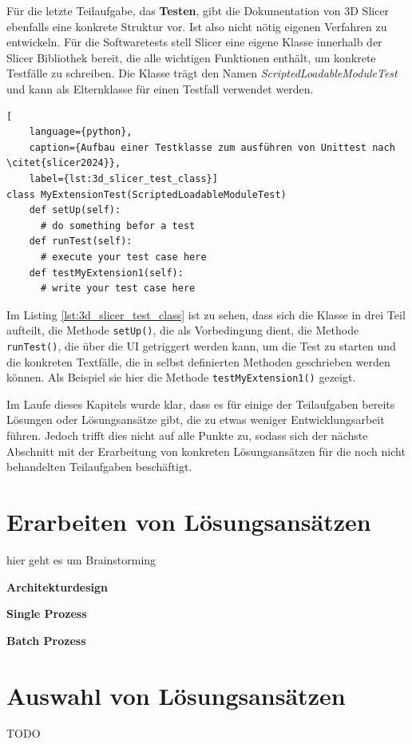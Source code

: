 Für die letzte Teilaufgabe, das \textbf{Testen}, gibt die Dokumentation von 3D Slicer
ebenfalls eine konkrete Struktur vor. Ist also nicht nötig eigenen Verfahren zu
entwickeln. Für die Softwaretests stell Slicer eine eigene Klasse innerhalb der Slicer
Bibliothek bereit, die alle wichtigen Funktionen enthält, um konkrete Testfälle zu
schreiben. Die Klasse trägt den Namen \textsl{ScriptedLoadableModuleTest} und kann
als Elternklasse für einen Testfall verwendet werden.

\begin{lstlisting}[
    language={python},
    caption={Aufbau einer Testklasse zum ausführen von Unittest nach \citet{slicer2024}},
    label={lst:3d_slicer_test_class}]
class MyExtensionTest(ScriptedLoadableModuleTest)
    def setUp(self):
      # do something befor a test
    def runTest(self):
      # execute your test case here
    def testMyExtension1(self):
      # write your test case here
\end{lstlisting}

Im Listing \ref{lst:3d_slicer_test_class} ist zu sehen, dass sich die Klasse in drei
Teil aufteilt, die Methode \texttt{setUp()}, die als Vorbedingung dient, die Methode
\texttt{runTest()}, die über die UI getriggert werden kann, um die Test zu
starten und die konkreten Textfälle, die in selbst definierten Methoden geschrieben
werden können. Als Beispiel sie hier die Methode \texttt{testMyExtension1()} gezeigt.

Im Laufe dieses Kapitels wurde klar, dass es für einige der Teilaufgaben bereits
Lösungen oder Lösungsansätze gibt, die zu etwas weniger Entwicklungsarbeit führen.
Jedoch trifft dies nicht auf alle Punkte zu, sodass sich der nächste Abschnitt mit
der Erarbeitung von konkreten Lösungsansätzen für die noch nicht behandelten Teilaufgaben
beschäftigt.

\section{Erarbeiten von Lösungsansätzen}
\label{sec:lösungsansätze} hier geht es um Brainstorming

\textbf{Architekturdesign}

\textbf{Single Prozess}

\textbf{Batch Prozess}


\section{Auswahl von Lösungsansätzen}

TODO